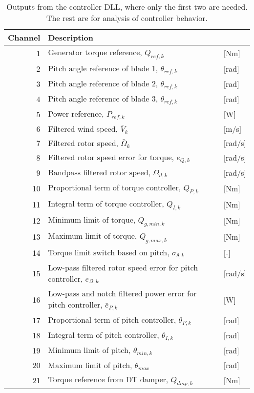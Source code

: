 \begin{table}[t]
\center
\begin{tabular}{r|ll}
Channel & Description \\ \hline
 1& Generator torque reference, $Q_{ref,k}$            &[Nm]\\
 2& Pitch angle reference of blade 1, $\theta_{ref,k}$      &[rad]\\
 3& Pitch angle reference of blade 2, $\theta_{ref,k}$      &[rad]\\
 4& Pitch angle reference of blade 3, $\theta_{ref,k}$      &[rad]\\
 5& Power reference, $P_{ref,k}$                       &[W]\\
 6& Filtered wind speed, $\bar V_k$                   &[m/s]\\
 7& Filtered rotor speed, $\bar \Omega_k$                  &[rad/s]\\
 8& Filtered rotor speed error for torque, $e_{Q,k}$ &[rad/s]\\
 9& Bandpass filtered rotor speed, $\Omega_{d,k}$         &[rad/s]\\
10& Proportional term of torque controller, $Q_{P,k}$    &[Nm]\\
11& Integral term of torque controller, $Q_{I,k}$    &[Nm]\\
12& Minimum limit of torque, $Q_{g,min,k}$               &[Nm]\\
13& Maximum limit of torque, $Q_{g,max,k}$               &[Nm]\\
14& Torque limit switch based on pitch, $\sigma_{\theta,k}$    &[-]\\
15& Low-pass filtered rotor speed error for pitch controller, $e_{\Omega,k}$  &[rad/s]\\
16& Low-pass and notch filtered power error for pitch controller, $\bar e_{P,k}$                 &[W]\\
17& Proportional term of pitch controller, $\theta_{P,k}$ &[rad]\\
18& Integral term of pitch controller, $\theta_{I,k}$     &[rad]\\
19& Minimum limit of pitch, $\theta_{min,k}$                &[rad]\\
20& Maximum limit of pitch, $\theta_{max}$                &[rad]\\
21& Torque reference from DT damper, $Q_{dmp,k}$       &[Nm]
\end{tabular}
\caption{Outputs from the controller DLL, where only the first two are needed. The rest are for analysis of controller behavior.  \label{t:output}}
\end{table}

